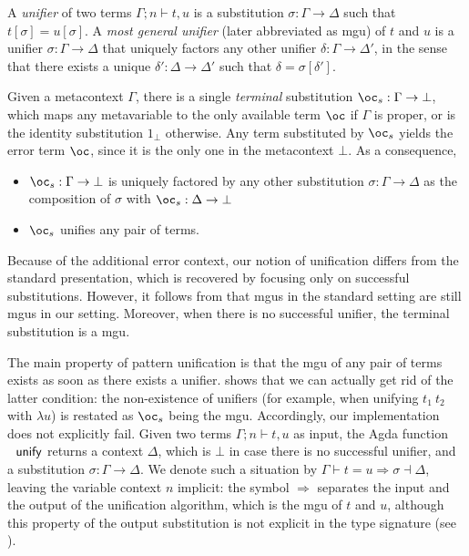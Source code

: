A \emph{unifier} of two terms $\Gamma;n\vdash t,u$ is a substitution
$\sigma:\Gamma\rightarrow\Delta$ such that $t[\sigma]=u[\sigma]$.
A \emph{most general unifier }(later abbreviated as mgu) of $t$ and
$u$ is a unifier $\sigma:\Gamma\rightarrow\Delta$ that uniquely
factors any other unifier $\delta:\Gamma\rightarrow\Delta'$, in the
sense that there exists a unique $\delta':\Delta\rightarrow\Delta'$
such that $\delta=\sigma[\delta']$. 
\begin{remark}
\label{rem:terminal-unifier}Given a metacontext $\Gamma$, there
is a single \emph{terminal} substitution $\bang_{s}:\Gamma\rightarrow\bot$,
which maps any metavariable to the only available term $\bang$ if
$\Gamma$ is proper, or is the identity substitution $1_{\bot}$ otherwise.
Any term substituted by $\bang_{s}$ yields the error term $\bang$,
since it is the only one in the metacontext $\bot$. As a consequence,
\begin{itemize}
\item $\bang_{s}:\Gamma\rightarrow\bot$ is uniquely factored by any other
substitution $\sigma:\Gamma\rightarrow\Delta$ as the composition
of $\sigma$ with $\bang_{s}:\Delta\rightarrow\bot$
\item $\bang_{s}$ unifies any pair of terms.
\end{itemize}
\end{remark}
%
\begin{remark}
\label{rem:mgus-standard}Because of the additional error context,
our notion of unification differs from the standard presentation,
which is recovered by focusing only on successful substitutions. However,
it follows from  that mgus in the standard
setting are still mgus in our setting. Moreover, when there is no
successful unifier, the terminal substitution is a mgu. 
\end{remark}
The main property of pattern unification is that the mgu of any pair
of terms exists as soon as there exists a unifier. 
shows that we can actually get rid of the latter condition: the non-existence
of unifiers (for example, when unifying $t_{1}\ t_{2}$ with $\lambda u$)
is restated as $\bang_{s}$ being the mgu. Accordingly, our implementation
does not explicitly fail. Given two terms $\Gamma;n\vdash t,u$ as
input, the Agda function $\AgdaFunction{unify}$ returns a context
$\Delta$, which is $\bot$ in case there is no successful unifier,
and a substitution $\sigma:\Gamma\rightarrow\Delta$. We denote such
a situation by $\Gamma\vdash t=u\Rightarrow\sigma\dashv\Delta$, leaving
the variable context $n$ implicit: the symbol $\Rightarrow$ separates
the input and the output of the unification algorithm, which is the
mgu of $t$ and $u$, although this property of the output substitution
is not explicit in the type signature (see ).

